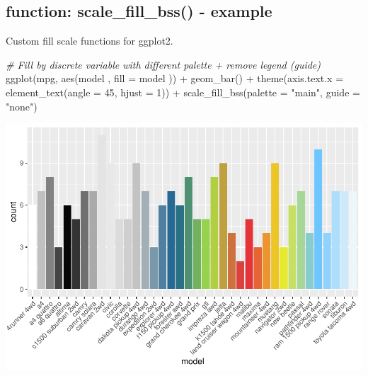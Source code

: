 \documentclass[
]{article}
\newenvironment{Shaded}{\begin{snugshade}}{\end{snugshade}}
\newcommand{\AttributeTok}[1]{\textcolor[rgb]{0.77,0.63,0.00}{#1}}
\newcommand{\CommentTok}[1]{\textcolor[rgb]{0.56,0.35,0.01}{\textit{#1}}}
\newcommand{\DecValTok}[1]{\textcolor[rgb]{0.00,0.00,0.81}{#1}}
\newcommand{\FunctionTok}[1]{\textcolor[rgb]{0.00,0.00,0.00}{#1}}
\newcommand{\NormalTok}[1]{#1}
\newcommand{\SpecialCharTok}[1]{\textcolor[rgb]{0.00,0.00,0.00}{#1}}
\newcommand{\StringTok}[1]{\textcolor[rgb]{0.31,0.60,0.02}{#1}}
\begin{document}
\hypertarget{function-scale_fill_bss---example}{%
\subsection{function: scale\_fill\_bss() -
example}\label{function-scale_fill_bss---example}}

Custom fill scale functions for ggplot2.

\begin{Shaded}
\begin{Highlighting}[]
\CommentTok{\# Fill by discrete variable with different palette + remove legend (guide)}
\FunctionTok{ggplot}\NormalTok{(mpg, }\FunctionTok{aes}\NormalTok{(model          , }\AttributeTok{fill =}\NormalTok{ model         )) }\SpecialCharTok{+}
  \FunctionTok{geom\_bar}\NormalTok{() }\SpecialCharTok{+}
  \FunctionTok{theme}\NormalTok{(}\AttributeTok{axis.text.x =} \FunctionTok{element\_text}\NormalTok{(}\AttributeTok{angle =} \DecValTok{45}\NormalTok{, }\AttributeTok{hjust =} \DecValTok{1}\NormalTok{)) }\SpecialCharTok{+}
  \FunctionTok{scale\_fill\_bss}\NormalTok{(}\AttributeTok{palette =} \StringTok{"main"}\NormalTok{, }\AttributeTok{guide =} \StringTok{"none"}\NormalTok{)}
\end{Highlighting}
\end{Shaded}

\includegraphics[width=1\linewidth]{man/figures/README-scale_fill_bss-1}
\end{document}
